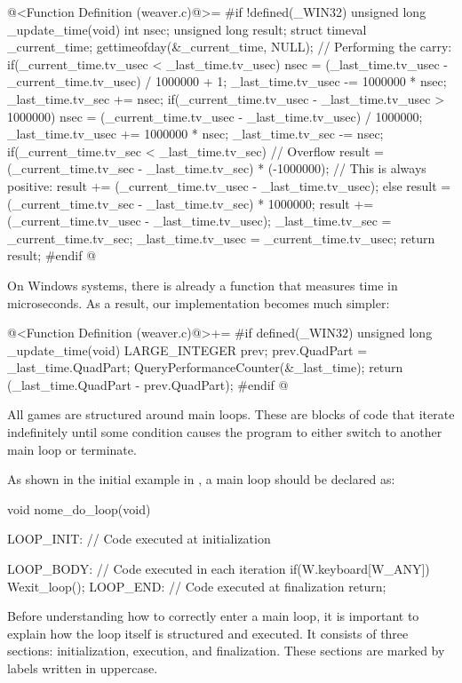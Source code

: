 \iniciocodigo
@<Function Definition (weaver.c)@>=
#if !defined(_WIN32)
unsigned long _update_time(void){
  int nsec;
  unsigned long result;
  struct timeval _current_time;
  gettimeofday(&_current_time, NULL);
  // Performing the carry:
  if(_current_time.tv_usec < _last_time.tv_usec){
    nsec = (_last_time.tv_usec - _current_time.tv_usec) / 1000000 + 1;
    _last_time.tv_usec -= 1000000 * nsec;
    _last_time.tv_sec += nsec;
  }
  if(_current_time.tv_usec - _last_time.tv_usec > 1000000){
    nsec = (_current_time.tv_usec - _last_time.tv_usec) / 1000000;
    _last_time.tv_usec += 1000000 * nsec;
    _last_time.tv_sec -= nsec;
  }
  if(_current_time.tv_sec < _last_time.tv_sec){
    // Overflow
    result = (_current_time.tv_sec - _last_time.tv_sec) * (-1000000);
    // This is always positive:
    result += (_current_time.tv_usec - _last_time.tv_usec);
  }
  else{
    result = (_current_time.tv_sec - _last_time.tv_sec) * 1000000;
    result += (_current_time.tv_usec - _last_time.tv_usec);
  }
  _last_time.tv_sec = _current_time.tv_sec;
  _last_time.tv_usec = _current_time.tv_usec;
  return result;
}
#endif
@
\fimcodigo

On Windows systems, there is already a function that measures time in
microseconds. As a result, our implementation becomes much simpler:

\iniciocodigo
@<Function Definition (weaver.c)@>+=
#if defined(_WIN32)
unsigned long _update_time(void){
  LARGE_INTEGER prev;
  prev.QuadPart = _last_time.QuadPart;
  QueryPerformanceCounter(&_last_time);
  return (_last_time.QuadPart - prev.QuadPart);
}
#endif
@
\fimcodigo


All games are structured around main loops. These are blocks of code
that iterate indefinitely until some condition causes the program to
either switch to another main loop or terminate.

As shown in the initial example in , a main loop
should be declared as:

\alinhaverbatim
void nome\_do\_loop(void){
 LOOP\_INIT: // Code executed at initialization

 LOOP\_BODY: // Code executed in each iteration
    if(W.keyboard[W\_ANY])
        Wexit\_loop();
 LOOP\_END: // Code executed at finalization
    return;
}
\alinhanormal

Before understanding how to correctly enter a main loop, it is
important to explain how the loop itself is structured and
executed. It consists of three sections: initialization, execution,
and finalization. These sections are marked by labels written in
uppercase.

